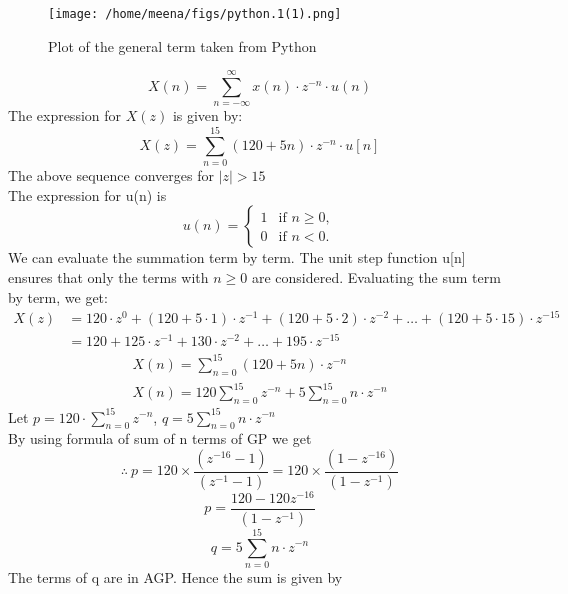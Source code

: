 \documentclass[journal,12pt,onecolumn]{IEEEtran}
\theoremstyle{remark}
\begin{document}
\begin{figure}[h]
  \centering
  \texttt{[image: /home/meena/figs/python.1(1).png]} %
  \captionsetup{justification=centering}
  \caption{Plot of the general term taken from Python}
  \label{fig:your_label}
\end{figure}
\[
X(n) = \sum_{n=-\infty}^{\infty} x(n) \cdot z^{-n}\cdot u(n)
\]
The expression for \(X(z)\) is given by:
\[
X(z) = \sum_{n=0}^{15} (120 + 5n) \cdot z^{-n} \cdot u[n]
\]
The above sequence  converges for \(\lvert z \rvert > 15\)\\
The expression for u(n) is 
\[ u(n) = \begin{cases}
    1 & \text{if } n \geq 0, \\
    0 & \text{if } n < 0.
\end{cases} \]
We can evaluate the summation term by term. The unit step function u[n] ensures that only the terms with \(n \geq 0\) are considered.
Evaluating the sum term by term, we get:
\[
\begin{aligned}
X(z) &= 120 \cdot z^0 + (120 + 5 \cdot 1) \cdot z^{-1} + (120 + 5 \cdot 2) \cdot z^{-2} + \ldots + (120 + 5 \cdot 15) \cdot z^{-15} \\
&= 120 + 125 \cdot z^{-1} + 130 \cdot z^{-2} + \ldots + 195 \cdot z^{-15}
\end{aligned}
\]
\[
\begin{aligned}
   X(n) = \sum_{n=0}^{15} (120+5n) \cdot z^{-n}\\
   X(n) = 120\sum_{n=0}^{15}z^{-n}+5\sum_{n=0}^{15}n\cdot z^{-n}
\end{aligned}
\]
Let \(p = 120 \cdot \sum_{n=0}^{15} z^{-n}\), \(q = 5\sum_{n=0}^{15}n\cdot z^{-n}\)\\
By using formula of sum of n terms of GP we get
\[\therefore\ p=120\times \frac{ ( z^{-16}-1)}{(z^{-1}-1)}=120\times \frac{ (1 - z^{-16})}{(1 - z^{-1})} \]
\[p=\frac{120-120 z^{-16}}{(1 - z^{-1})}\]
\[
   q= 5\sum_{n=0}^{15}n\cdot z^{-n}
\]
The terms of q are in AGP. Hence the sum is given by
\end{document}
